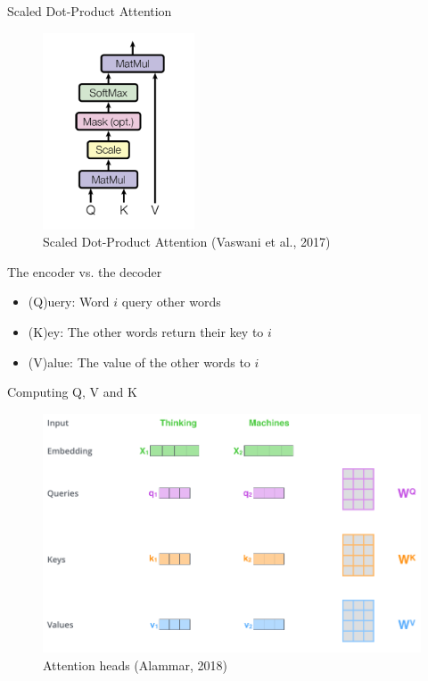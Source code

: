 \documentclass[10pt]{beamer}
\begin{document}
\begin{frame}{Scaled Dot-Product Attention}

\begin{figure}[h]
\centering
\includegraphics[width=0.4\textwidth]{fig/Vaswani_2_scaled_dot.png}
\caption{Scaled Dot-Product Attention (Vaswani et al., 2017)}
\end{figure}

\end{frame}


\begin{frame}{The encoder vs. the decoder}

\begin{itemize}
\item (Q)uery: Word $i$ query other words
\item (K)ey: The other words return their key to $i$
\item (V)alue: The value of the other words to $i$
\end{itemize}
\end{frame}


\begin{frame}{Computing Q, V and K}

\begin{figure}[h]
\centering
\includegraphics[width=1\textwidth]{fig/alammar_transformer_self_attention_vectors.png}
\caption{Attention heads (Alammar, 2018)}
\end{figure}

\end{frame}
\end{document}
